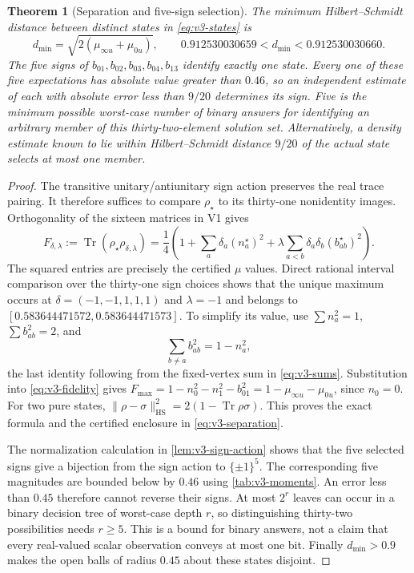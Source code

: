 \documentclass[11pt]{article}
\newtheorem{theorem}{Theorem}[section]
\theoremstyle{definition}
\theoremstyle{remark}
\newcommand{\Tr}{\operatorname{Tr}}
\newcommand{\HS}{\mathrm{HS}}
\newcommand{\norm}[1]{\lVert#1\rVert}
\begin{document}
\begin{theorem}[Separation and five-sign selection]
\label{thm:v3-five-bits}
The minimum Hilbert--Schmidt distance between distinct states in
\eqref{eq:v3-states} is
\begin{equation}
 d_{\min}=\sqrt{2(\mu_{\infty u}+\mu_{0u})},\qquad
 \boxed{0.912530030659<d_{\min}<0.912530030660.}
 \label{eq:v3-separation}
\end{equation}
The five signs of $b_{01},b_{02},b_{03},b_{04},b_{13}$ identify exactly one
state. Every one of these five expectations has absolute value greater
than $0.46$, so an independent estimate of each with absolute error less
than $9/20$ determines its sign. Five is the minimum possible worst-case
number of binary answers for identifying an arbitrary member of this
thirty-two-element solution set. Alternatively, a density estimate known
to lie within Hilbert--Schmidt distance $9/20$ of the actual state selects
at most one member.
\end{theorem}
\begin{proof}
The transitive unitary/antiunitary sign action preserves the real trace
pairing. It therefore suffices to compare $\rho_\star$ to its thirty-one
nonidentity images. Orthogonality of the sixteen matrices in V1 gives
\begin{equation}
 F_{\delta,\lambda}
 :=\Tr(\rho_\star\rho_{\delta,\lambda})
 =\frac14\left(1+\sum_a\delta_a(n_a^\star)^2
       +\lambda\sum_{a<b}\delta_a\delta_b(b_{ab}^\star)^2\right).
 \label{eq:v3-fidelity}
\end{equation}
The squared entries are precisely the certified $\mu$ values. Direct
rational interval comparison over the thirty-one sign choices shows that
the unique maximum occurs at
$\delta=(-1,-1,1,1,1)$ and $\lambda=-1$ and belongs to
$[0.583644471572,0.583644471573]$. To simplify its value, use
$\sum n_a^2=1$, $\sum b_{ab}^2=2$, and
\[
 \sum_{b\ne a}b_{ab}^2=1-n_a^2,
\]
the last identity following from the fixed-vertex sum in
\eqref{eq:v3-sums}. Substitution into \eqref{eq:v3-fidelity} gives
$F_{\max}=1-n_0^2-n_1^2-b_{01}^2
=1-\mu_{\infty u}-\mu_{0u}$, since $n_0=0$.
For two pure states, $\norm{\rho-\sigma}_{\HS}^2=2(1-\Tr\rho\sigma)$.
This proves the exact formula and the certified enclosure in
\eqref{eq:v3-separation}.

The normalization calculation in \cref{lem:v3-sign-action} shows that the
five selected signs give a bijection from the sign action to $\{\pm1\}^5$.
The corresponding five magnitudes are bounded below by $0.46$ using
\cref{tab:v3-moments}. An error less than $0.45$ therefore cannot reverse
their signs. At most $2^r$ leaves can occur in a binary decision tree of
worst-case depth $r$, so distinguishing thirty-two possibilities needs
$r\ge5$. This is a bound for binary answers, not a claim that every
real-valued scalar observation conveys at most one bit.
Finally $d_{\min}>0.9$ makes the open balls of radius $0.45$ about these
states disjoint.
\end{proof}
\end{document}
